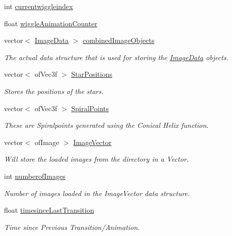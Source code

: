 \begin{DoxyCompactItemize}
int \hyperlink{group___wiggle_ga6b9af0b1ae4a2c0530eb6a8cf8340751}{currentwiggleindex}
\item 
float \hyperlink{group___wiggle_ga6073b33be7847d675ec089a1d514c506}{wiggle\-Animation\-Counter}
\item 
vector$<$ \hyperlink{struct_image_data}{Image\-Data} $>$ \hyperlink{classtest_app_aced9b8a8419c8465877c2c9cd43f8934}{combined\-Image\-Objects}
\begin{DoxyCompactList}\small\item\em The actual data structure that is used for storing the \hyperlink{struct_image_data}{Image\-Data} objects. \end{DoxyCompactList}\item 
vector$<$ of\-Vec3f $>$ \hyperlink{classtest_app_a68d0d30cea64a9d39a1b2deef16677ad}{Star\-Positions}
\begin{DoxyCompactList}\small\item\em Stores the positions of the stars. \end{DoxyCompactList}\item 
vector$<$ of\-Vec3f $>$ \hyperlink{classtest_app_af0dd2f3e3aabdb43bee49d74c156dc05}{Spiral\-Points}
\begin{DoxyCompactList}\small\item\em These are Spiralpoints generated using the Conical Helix function. \end{DoxyCompactList}\item 
vector$<$ of\-Image $>$ \hyperlink{classtest_app_ad4de5d6e6e8f3b8bb7424e62792deb1f}{Image\-Vector}
\begin{DoxyCompactList}\small\item\em Will store the loaded images from the directory in a Vector. \end{DoxyCompactList}\item 
int \hyperlink{classtest_app_a957cf7fdb3ea964a88ca1be13e4d68fc}{numberof\-Images}
\begin{DoxyCompactList}\small\item\em Number of images loaded in the Image\-Vector data structure. \end{DoxyCompactList}\item 
float \hyperlink{classtest_app_acb60fb8a89e9ec5d461630a20b11ceda}{timesince\-Last\-Transition}
\begin{DoxyCompactList}\small\item\em Time since Previous Transition/\-Animation. \end{DoxyCompactList}\item 

\end{DoxyCompactItemize}
